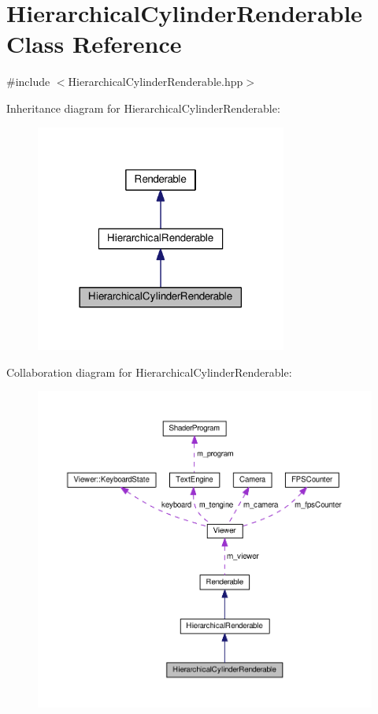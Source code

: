 \hypertarget{classHierarchicalCylinderRenderable}{\section{Hierarchical\+Cylinder\+Renderable Class Reference}
\label{classHierarchicalCylinderRenderable}
}


{\ttfamily \#include $<$Hierarchical\+Cylinder\+Renderable.\+hpp$>$}



Inheritance diagram for Hierarchical\+Cylinder\+Renderable\+:\nopagebreak
\begin{figure}[H]
\begin{center}
\leavevmode
\includegraphics[width=234pt]{classHierarchicalCylinderRenderable__inherit__graph}
\end{center}
\end{figure}


Collaboration diagram for Hierarchical\+Cylinder\+Renderable\+:\nopagebreak
\begin{figure}[H]
\begin{center}
\leavevmode
\includegraphics[width=350pt]{classHierarchicalCylinderRenderable__coll__graph}
\end{center}
\end{figure}
